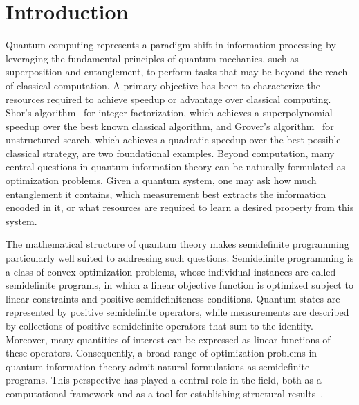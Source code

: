\chapter{Introduction} \label{ch:introduction}

Quantum computing represents a paradigm shift in information processing by leveraging the fundamental principles of quantum mechanics, such as superposition and entanglement, to perform tasks that may be beyond the reach of classical computation. 
A primary objective has been to characterize the resources required to achieve speedup or advantage over classical computing. 
Shor’s algorithm~\cite{shor1997} for integer factorization, which achieves a superpolynomial speedup over the best known classical algorithm, and Grover’s algorithm~\cite{grover1996fastquantummechanicalalgorithm} for unstructured search, which achieves a quadratic speedup over the best possible classical strategy, are two foundational examples. 
Beyond computation, many central questions in quantum information theory can be naturally formulated as optimization problems. 
Given a quantum system, one may ask how much entanglement it contains, which measurement best extracts the information encoded in it, or what resources are required to learn a desired property from this system.


The mathematical structure of quantum theory makes semidefinite programming~\cite{vandenberghe1996semidefinite, tunccel2016polyhedral} particularly well suited to addressing such questions. 
Semidefinite programming is a class of convex optimization problems, whose individual instances are called semidefinite programs, in which a linear objective function is optimized subject to linear constraints and positive semidefiniteness conditions. 
Quantum states are represented by positive semidefinite operators, while measurements are described by collections of positive semidefinite operators that sum to the identity. 
Moreover, many quantities of interest can be expressed as linear functions of these operators. 
Consequently, a broad range of optimization problems in quantum information theory admit natural formulations as semidefinite programs. 
This perspective has played a central role in the field, both as a computational framework and as a tool for establishing structural results~\cite{skrzypczyk2023semidefinite}.

